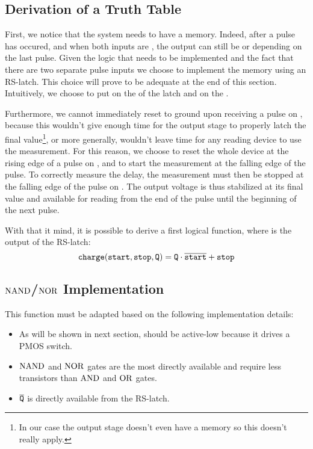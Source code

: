 \subsection{Derivation of a Truth Table}
First, we notice that the system needs to have a memory.
Indeed, after a pulse has occured, and when both inputs are , the output  can still be  or  depending on the last pulse.
Given the logic that needs to be implemented and the fact that there are two separate pulse inputs we choose to implement the memory using an RS-latch.
This choice will prove to be adequate at the end of this section.
Intuitively, we choose to put  on the  of the latch and  on the .

Furthermore, we cannot immediately reset  to ground upon receiving a pulse on , because this wouldn't give enough time for the output stage to properly latch the final value\footnote{In our case the output stage doesn't even have a memory so this doesn't really apply.}, or more generally, wouldn't leave time for any reading device to use the measurement.
For this reason, we choose to reset the whole device at the rising edge of a pulse on , and to start the measurement at the falling edge of the pulse.
To correctly measure the delay, the measurement must then be stopped at the falling edge of the pulse on .
The output voltage is thus stabilized at its final value and available for reading from the end of the  pulse until the beginning of the next  pulse.

With that it mind, it is possible to derive a first logical function, where  is the output of the RS-latch:
\begin{equation}
\mathtt{charge}(\mathtt{start}, \mathtt{stop}, \mathtt{Q}) = \mathtt{Q}\cdot\overline{\mathtt{start}} + \mathtt{stop}\label{eqn:1logic}
\end{equation}

\subsection{$\operatorname{NAND}$/$\operatorname{NOR}$ Implementation}
This function must be adapted based on the following implementation details:
\begin{itemize}
  \item As will be shown in next section,  should be active-low because it drives a PMOS switch.
  \item $\operatorname{NAND}$ and $\operatorname{NOR}$ gates are the most directly available and require less transistors than $\operatorname{AND}$ and $\operatorname{OR}$ gates.
  \item $\overline{\mathtt{Q}}$ is directly available from the RS-latch.
\end{itemize}

